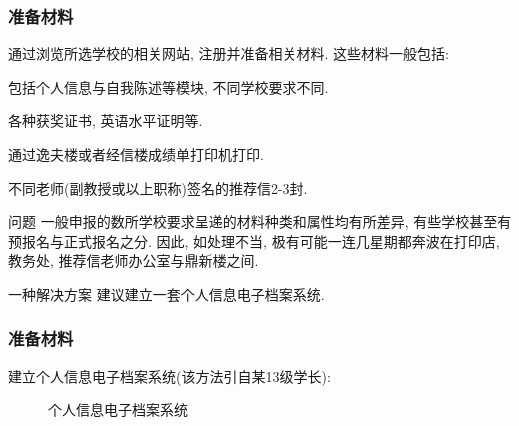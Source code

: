 \documentclass[usenames,dvipsnames]{beamer}
\begin{document}
    \begin{frame}
      \frametitle{准备材料}
      通过浏览所选学校的相关网站, 注册并准备相关材料. 这些材料一般包括:

      \begin{description}[leftmargin=!,labelwidth=\widthof{\bfseries 个人简历}]
        \small
        \item[个人简历] 包括个人信息与自我陈述等模块, 不同学校要求不同.
        \item[相关证书] 各种获奖证书, 英语水平证明等.
        \item[成绩单]   通过逸夫楼或者经信楼成绩单打印机打印. 
        \item[推荐信]   不同老师(副教授或以上职称)签名的推荐信2-3封.
      \end{description}

      \begin{alertblock}{问题}
        一般申报的数所学校要求呈递的材料种类和属性均有所差异, 有些学校甚至有预报名与正式报名之分. 因此, 如处理不当, 极有可能一连几星期都奔波在打印店, 教务处, 推荐信老师办公室与鼎新楼之间.
      \end{alertblock}

      \begin{block}{一种解决方案}
        建议建立一套个人信息电子档案系统.
      \end{block}
    \end{frame} 

    \begin{frame}
      \frametitle{准备材料}
      建立个人信息电子档案系统(该方法引自某13级学长):
      \begin{figure} 
        \caption{个人信息电子档案系统}
      \end{figure} 
    \end{frame} 
\end{document}
